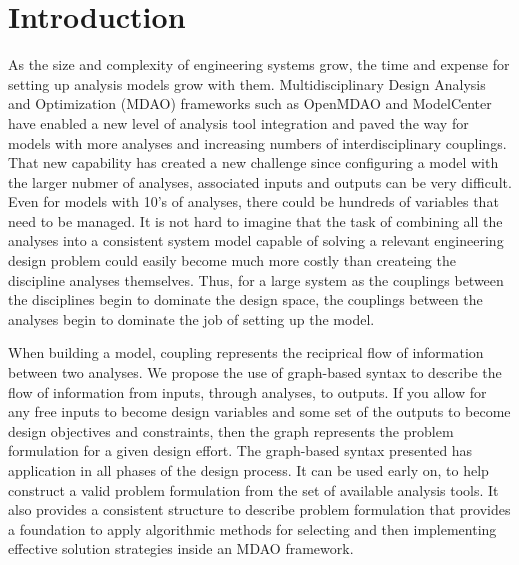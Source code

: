 \section{Introduction}
    
    As the size and complexity of engineering systems grow, the time and expense for setting up 
    analysis models grow with them. Multidisciplinary Design Analysis and Optimization (MDAO)
    frameworks such as OpenMDAO\cite{Gray2012} and ModelCenter have enabled a new level of analysis tool integration 
    and paved the way for models with more analyses and increasing numbers of interdisciplinary couplings. That 
    new capability has created a new challenge since configuring a model with the larger nubmer of analyses, associated inputs and outputs
    can be very difficult. Even for models with 10's of analyses, there could be hundreds of variables that need to be managed. 
    It is not hard to imagine that the task of combining all the analyses into a consistent system model capable of solving a relevant 
    engineering design problem could easily become much more costly than createing the discipline analyses themselves. Thus, for a large system
    as the couplings between the disciplines begin to dominate the design space, the couplings between the analyses begin to dominate 
    the job of setting up the model. 
    
    When building a model, coupling represents the reciprical flow of information between two analyses. 
    We propose the use of graph-based syntax to describe the flow of information from inputs, 
    through analyses, to outputs. If you allow for any free inputs to become design
    variables and some set of the outputs to become design objectives and constraints, then the graph 
    represents the problem formulation for a given design effort. 
    The graph-based syntax presented has application in all phases of the design process. 
    It can be used early on, to help construct a valid problem formulation from the set of available analysis tools. 
    It also provides a consistent structure to describe problem formulation that provides a foundation to apply
    algorithmic methods for selecting and then implementing effective solution strategies inside an MDAO framework. 

